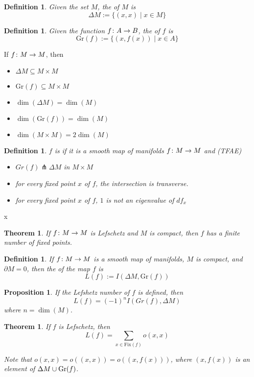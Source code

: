 \documentclass[11pt]{amsbook}
\theoremstyle{mystyle} %
\newtheorem{thrm}[thm]{Theorem}
\newtheorem{defi}[thm]{Definition}
\newtheorem{propo}[thm]{Proposition}
\numberwithin{thm}{section}
\newcommand{\Fix}{\text{Fix}}
\newcommand{\Gr}{\text{Gr}}
\renewcommand{\d}{\partial}
\newcommand{\transverse}{\pitchfork}
\newcommand{\x}{\times}
\begin{document}
\begin{defi}
	Given the set $M$, the  of $M$ is $$\Delta M := \{ (x,x) \mid x \in M \}$$
\end{defi}
\begin{defi}
	Given the function $f\colon A \to B$, the  of $f$ is $$\Gr(f) := \{ (x, f(x)) \mid x \in A \}$$
\end{defi}
\begin{rmk}
	If $f\colon M \to M$, then
	\begin{itemize}
		\item $\Delta M \subseteq M \x M$
		\item $\Gr(f) \subseteq M \x M$
		\item $\dim(\Delta M) = \dim(M)$
		\item $\dim(\Gr(f)) = \dim(M)$
		\item $\dim(M \x M) = 2\dim(M)$
	\end{itemize}
\end{rmk}
\begin{defi}
	$f$ is  if it is a smooth map of manifolds $f\colon M \to M$ and (TFAE)
	\begin{itemize}
		\item $Gr(f) \transverse \Delta M$ in $M \x M$
		\item for every fixed point $x$ of $f$, the intersection is transverse.
		\item for every fixed point $x$ of $f$, $1$ is not an eigenvalue of $df_x$
	\end{itemize}
\end{defi}

x\begin{thrm}
	If $f\colon M \to M$ is Lefschetz and $M$ is compact, then $f$ has a finite number of fixed points.
\end{thrm}
\begin{defi}
	If $f \colon M \to M$ is a smooth map of manifolds, $M$ is compact, and $\d M = 0$, then the  of the map $f$ is $$L(f) := I(\Delta M, \Gr(f))$$
\end{defi}
\begin{propo}
	If the Lefshetz number of $f$ is defined, then $$L(f) = (-1)^n I(Gr(f), \Delta M)$$ where $n = \dim(M)$.
\end{propo}
\begin{thrm}
	If $f$ is Lefschetz, then $$L(f) = \sum_{x \in \Fix(f)} o(x,x)$$

	Note that $o(x,x) = o((x,x)) = o((x,f(x)))$, where $(x, f(x))$ is an element of $\Delta M \union \Gr(f)$.
\end{thrm}
\end{document}
